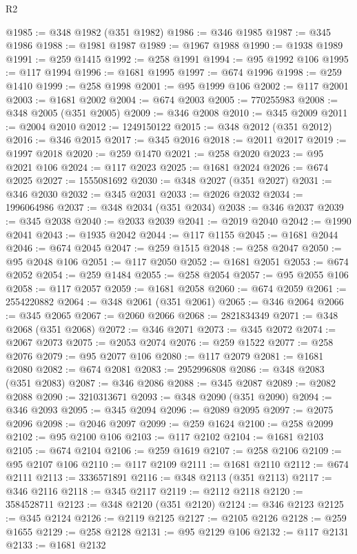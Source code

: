 \begin{lexlean}{R2}
\begin{coremodule}
@1985 := @348 @1982 (@351 @1982)
@1986 := @346 @1985
@1987 := @345 @1986
@1988 := @1981 @1987
@1989 := @1967 @1988
@1990 := @1938 @1989
@1991 := @259 @1415
@1992 := @258 @1991
@1994 := @95 @1992 @106
@1995 := @117 @1994
@1996 := @1681 @1995
@1997 := @674 @1996
@1998 := @259 @1410
@1999 := @258 @1998
@2001 := @95 @1999 @106
@2002 := @117 @2001
@2003 := @1681 @2002
@2004 := @674 @2003
@2005 := 770255983
@2008 := @348 @2005 (@351 @2005)
@2009 := @346 @2008
@2010 := @345 @2009
@2011 := @2004 @2010
@2012 := 1249150122
@2015 := @348 @2012 (@351 @2012)
@2016 := @346 @2015
@2017 := @345 @2016
@2018 := @2011 @2017
@2019 := @1997 @2018
@2020 := @259 @1470
@2021 := @258 @2020
@2023 := @95 @2021 @106
@2024 := @117 @2023
@2025 := @1681 @2024
@2026 := @674 @2025
@2027 := 1555081692
@2030 := @348 @2027 (@351 @2027)
@2031 := @346 @2030
@2032 := @345 @2031
@2033 := @2026 @2032
@2034 := 1996064986
@2037 := @348 @2034 (@351 @2034)
@2038 := @346 @2037
@2039 := @345 @2038
@2040 := @2033 @2039
@2041 := @2019 @2040
@2042 := @1990 @2041
@2043 := @1935 @2042
@2044 := @117 @1155
@2045 := @1681 @2044
@2046 := @674 @2045
@2047 := @259 @1515
@2048 := @258 @2047
@2050 := @95 @2048 @106
@2051 := @117 @2050
@2052 := @1681 @2051
@2053 := @674 @2052
@2054 := @259 @1484
@2055 := @258 @2054
@2057 := @95 @2055 @106
@2058 := @117 @2057
@2059 := @1681 @2058
@2060 := @674 @2059
@2061 := 2554220882
@2064 := @348 @2061 (@351 @2061)
@2065 := @346 @2064
@2066 := @345 @2065
@2067 := @2060 @2066
@2068 := 2821834349
@2071 := @348 @2068 (@351 @2068)
@2072 := @346 @2071
@2073 := @345 @2072
@2074 := @2067 @2073
@2075 := @2053 @2074
@2076 := @259 @1522
@2077 := @258 @2076
@2079 := @95 @2077 @106
@2080 := @117 @2079
@2081 := @1681 @2080
@2082 := @674 @2081
@2083 := 2952996808
@2086 := @348 @2083 (@351 @2083)
@2087 := @346 @2086
@2088 := @345 @2087
@2089 := @2082 @2088
@2090 := 3210313671
@2093 := @348 @2090 (@351 @2090)
@2094 := @346 @2093
@2095 := @345 @2094
@2096 := @2089 @2095
@2097 := @2075 @2096
@2098 := @2046 @2097
@2099 := @259 @1624
@2100 := @258 @2099
@2102 := @95 @2100 @106
@2103 := @117 @2102
@2104 := @1681 @2103
@2105 := @674 @2104
@2106 := @259 @1619
@2107 := @258 @2106
@2109 := @95 @2107 @106
@2110 := @117 @2109
@2111 := @1681 @2110
@2112 := @674 @2111
@2113 := 3336571891
@2116 := @348 @2113 (@351 @2113)
@2117 := @346 @2116
@2118 := @345 @2117
@2119 := @2112 @2118
@2120 := 3584528711
@2123 := @348 @2120 (@351 @2120)
@2124 := @346 @2123
@2125 := @345 @2124
@2126 := @2119 @2125
@2127 := @2105 @2126
@2128 := @259 @1655
@2129 := @258 @2128
@2131 := @95 @2129 @106
@2132 := @117 @2131
@2133 := @1681 @2132

\end{coremodule}
\end{lexlean}
